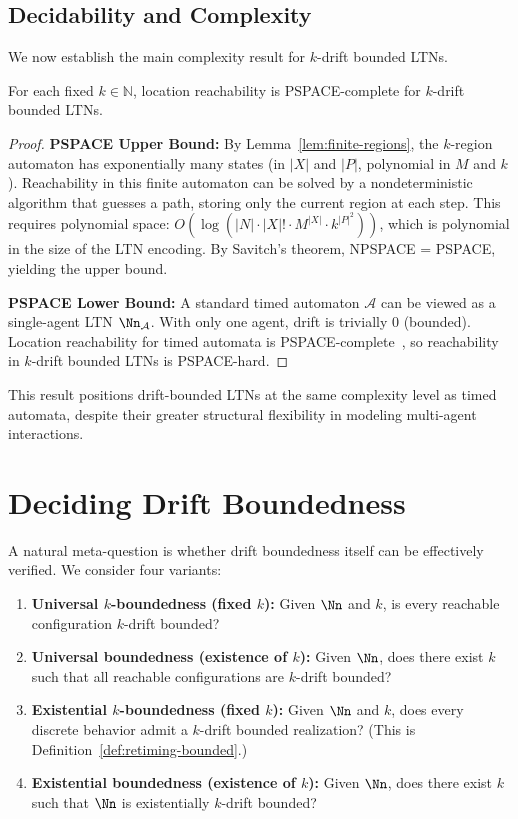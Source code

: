 \subsection{Decidability and Complexity}
\label{sec:drift-complexity}

We now establish the main complexity result for $k$-drift bounded LTNs.

\begin{theorem}
\label{thm:drift-pspace}
For each fixed $k \in \mathbb{N}$, location reachability is PSPACE-complete for $k$-drift bounded LTNs.
\end{theorem}

\begin{proof}
\textbf{PSPACE Upper Bound:} 
By Lemma~\ref{lem:finite-regions}, the $k$-region automaton has exponentially many states (in $|X|$ and $|P|$, polynomial in $M$ and $k$). Reachability in this finite automaton can be solved by a nondeterministic algorithm that guesses a path, storing only the current region at each step. This requires polynomial space: $O(\log(|N| \cdot |X|! \cdot M^{|X|} \cdot k^{|P|^2}))$, which is polynomial in the size of the LTN encoding. By Savitch's theorem, NPSPACE = PSPACE, yielding the upper bound.

\textbf{PSPACE Lower Bound:} 
A standard timed automaton $\mathcal{A}$ can be viewed as a single-agent LTN $\Nn_{\mathcal{A}}$. With only one agent, drift is trivially 0 (bounded). Location reachability for timed automata is PSPACE-complete~\cite{AlurDill94}, so reachability in $k$-drift bounded LTNs is PSPACE-hard.
\end{proof}

This result positions drift-bounded LTNs at the same complexity level as timed automata, despite their greater structural flexibility in modeling multi-agent interactions.

\section{Deciding Drift Boundedness}
\label{sec:drift-meta}

A natural meta-question is whether drift boundedness itself can be effectively verified. We consider four variants:

\begin{enumerate}
\item \textbf{Universal $k$-boundedness (fixed $k$):} Given $\Nn$ and $k$, is every reachable configuration $k$-drift bounded?
\item \textbf{Universal boundedness (existence of $k$):} Given $\Nn$, does there exist $k$ such that all reachable configurations are $k$-drift bounded?
\item \textbf{Existential $k$-boundedness (fixed $k$):} Given $\Nn$ and $k$, does every discrete behavior admit a $k$-drift bounded realization? (This is Definition~\ref{def:retiming-bounded}.)
\item \textbf{Existential boundedness (existence of $k$):} Given $\Nn$, does there exist $k$ such that $\Nn$ is existentially $k$-drift bounded?
\end{enumerate}

